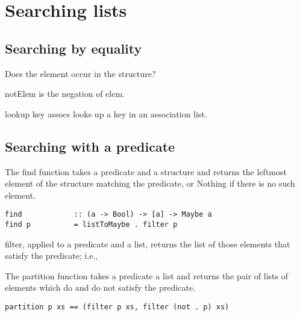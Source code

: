 \section{Searching lists}
\subsection{Searching by equality}

Does the element occur in the structure?

notElem is the negation of elem.

lookup key assocs looks up a key in an association list.

\subsection{Searching with a predicate}
The find function takes a predicate and a structure and returns the leftmost element of the structure matching the predicate, or Nothing if there is no such element.
\begin{lstlisting}[frame=single]
find            :: (a -> Bool) -> [a] -> Maybe a
find p          = listToMaybe . filter p
\end{lstlisting}

filter, applied to a predicate and a list, returns the list of those elements that satisfy the predicate; i.e.,

The partition function takes a predicate a list and returns the pair of lists of elements which do and do not satisfy the predicate.
\begin{lstlisting}[frame=single]
partition p xs == (filter p xs, filter (not . p) xs)
\end{lstlisting}